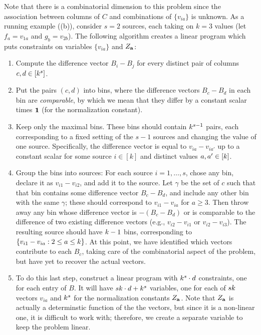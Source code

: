 Note that there is a combinatorial dimension to this problem since the association between
columns of $C$ and combinations of $\{ v_{ia} \}$ is unknown.
As a running example ((b)),
consider $s=2$ sources, each taking on $k=3$ values (let $f_a = v_{1a}$ and $g_b = v_{2b}$).
The following algorithm creates a linear program which puts constraints on variables $\{v_{ia}\}$ and $Z_{\mathbf{a}}$:
\begin{enumerate}

\item Compute the difference vector $B_i - B_j$ for every distinct pair of columns $c,d \in [k^s]$.

\item Put the pairs $(c,d)$ into bins, where the difference vectors $B_c-B_d$
in each bin are \emph{comparable}, by which we mean that they
differ by a constant scalar times $\mathbf{1}$ (for the normalization constant).

\item Keep only the maximal bins.
These bins should contain $k^{s-1}$ pairs, each corresponding to a fixed setting of the $s-1$ sources
and changing the value of one source.
Specifically, the difference vector is equal to $v_{ia} - v_{ia'}$ up to a
constant scalar for some source $i \in [k]$ and distinct values $a, a' \in
[k]$.

\item Group the bins into sources:
  For each source $i = 1, \dots, s$,
  chose any bin, declare it as $v_{i1} - v_{i2}$, and add it to the source.
  Let $\gamma$ be the set of $c$ such that that bin contains some difference vector $B_c - B_d$,
  and include any other bin with the same $\gamma$; these should correspond to $v_{i1} - v_{ia}$ for $a \ge 3$.
  Then throw away any bin whose difference vector is $-(B_c - B_d)$
  or is comparable to the difference of two existing difference vectors (e.g., $v_{i2} - v_{i1}$ or $v_{i2} - v_{i3}$).
  The resulting source should have $k-1$ bins, corresponding to $\{ v_{i1} - v_{ia} : 2 \le a \le k \}$.
  At this point, we have identified which vectors contribute to each $B_c$,
  taking care of the combinatorial aspect of the problem,
  but have yet to recover the actual vectors.

  \item To do this last step, construct a linear program with $k^s \cdot d$ constraints, one for each entry of $B$.
  It will have $sk \cdot d + k^s$ variables,
  one for each of $sk$ vectors $v_{ia}$ and $k^s$ for the normalization constants $Z_{\mathbf{a}}$.
  Note that $Z_{\mathbf{a}}$ is actually a determinstic function of the the vectors, but since it is a non-linear one,
  it is difficult to work with; therefore, we create a separate variable to keep the problem linear.


\end{enumerate}
